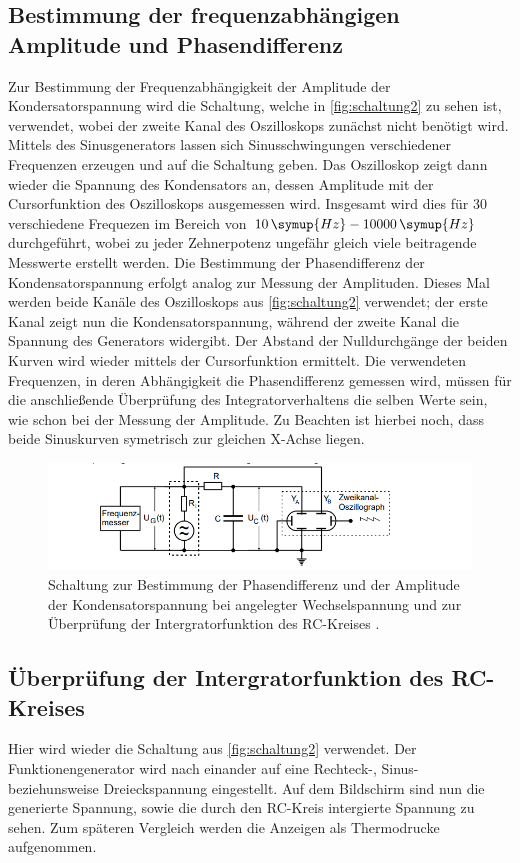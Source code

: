 \subsection{Bestimmung der frequenzabhängigen Amplitude und Phasendifferenz}
Zur Bestimmung der Frequenzabhängigkeit der Amplitude der Kondersatorspannung wird die Schaltung, welche in \autoref{fig:schaltung2} zu 
sehen ist, verwendet, wobei der zweite Kanal des Oszilloskops zunächst nicht benötigt wird.
Mittels des Sinusgenerators lassen sich Sinusschwingungen verschiedener Frequenzen erzeugen und auf die Schaltung geben. Das Oszilloskop 
zeigt dann wieder die Spannung des Kondensators an, dessen Amplitude mit der Cursorfunktion des Oszilloskops ausgemessen wird. Insgesamt 
wird dies für 30 verschiedene Frequezen im Bereich von $10 \, \symup{Hz} - 10000 \, \symup{Hz}$ durchgeführt, wobei zu jeder Zehnerpotenz ungefähr
gleich viele beitragende Messwerte erstellt werden. 
Die Bestimmung der Phasendifferenz der Kondensatorspannung erfolgt analog zur Messung der Amplituden. Dieses Mal werden beide Kanäle 
des Oszilloskops aus \autoref{fig:schaltung2} verwendet; der erste Kanal zeigt nun die Kondensatorspannung, während der zweite Kanal
die Spannung des Generators widergibt. Der Abstand der Nulldurchgänge der beiden Kurven wird wieder mittels der Cursorfunktion ermittelt.
Die verwendeten Frequenzen, in deren Abhängigkeit die Phasendifferenz gemessen wird, müssen für die anschließende Überprüfung des Integratorverhaltens
die selben Werte sein, wie schon bei der Messung der Amplitude. Zu Beachten ist hierbei noch, dass beide Sinuskurven symetrisch zur gleichen
X-Achse liegen. 
\begin{figure}
    \centering
    \includegraphics[width=\textwidth]{content/schaltung2.png}
    \caption{Schaltung zur Bestimmung der Phasendifferenz und der Amplitude der Kondensatorspannung bei angelegter Wechselspannung und zur Überprüfung der Intergratorfunktion des RC-Kreises \cite[282]{v353}.}
    \label{fig:schaltung2}
\end{figure}
\subsection{Überprüfung der Intergratorfunktion des RC-Kreises}
Hier wird wieder die Schaltung aus \autoref{fig:schaltung2} verwendet. Der Funktionengenerator wird nach einander auf eine Rechteck-, Sinus-
beziehunsweise Dreieckspannung eingestellt. Auf dem Bildschirm sind nun die generierte Spannung, sowie die durch den RC-Kreis intergierte
Spannung zu sehen. Zum späteren Vergleich werden die Anzeigen als Thermodrucke aufgenommen.
